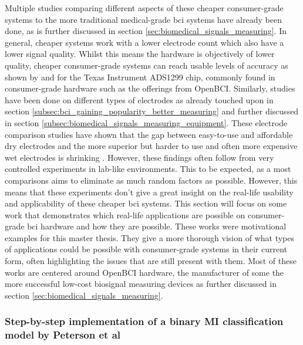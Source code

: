 Multiple studies comparing different aspects of these cheaper consumer-grade systems to the more traditional medical-grade \gls{bci} systems have already been done, as is further discussed in section \ref{sec:biomedical_signals_measuring}.
In general, cheaper systems work with a lower electrode count which also have a lower signal quality.
Whilst this means the hardware is objectively of lower quality, cheaper consumer-grade systems can reach usable levels of accuracy as shown by \citet{openbci_vs_medical} and \citet{openbci_eeg_sensor_evaluation} for the Texas Instrument ADS1299 chip, commonly found in consumer-grade hardware such as the offerings from OpenBCI.
Similarly, studies have been done on different types of electrodes as already touched upon in section \ref{subsec:bci_gaining_popularity_better_measuring} and further discussed in section \ref{subsec:biomedical_signals_measuring_equipment}.
These electrode comparison studies have shown that the gap between easy-to-use and affordable dry electrodes and the more superior but harder to use and often more expensive wet electrodes is shrinking \citep{wet_vs_dry, dry_electrode_status, wet_dry_comparison_experiment}.
However, these findings often follow from very controlled experiments in lab-like environments.
This to be expected, as a most comparisons aims to eliminate as much random factors as possible.
However, this means that these experiments don't give a great insight on the real-life usability and applicability of these cheaper \gls{bci} systems.
This section will focus on some work that demonstrates which real-life applications are possible on consumer-grade \gls{bci} hardware and how they are possible.
These works were motivational examples for this master thesis.
They give a more thorough vision of what types of applications could be possible with consumer-grade systems in their current form, often highlighting the issues that are still present with them.
Most of these works are centered around OpenBCI hardware, the manufacturer of some the more successful low-cost \gls{biosignal} measuring devices as further discussed in section \ref{sec:biomedical_signals_measuring}.


\subsubsection{Step-by-step implementation of a binary MI classification model by Peterson et al}
\label{subsubsec:bci_small_projects_motivating_examples_binary}

